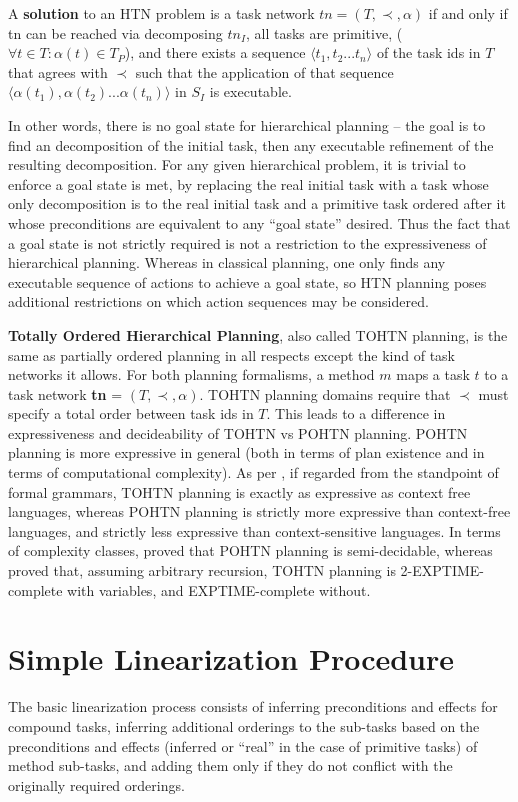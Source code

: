 \documentclass[letterpaper]{article} %
\begin{document}
A \textbf{solution} to an HTN problem is a task network $tn = (T, \prec, \alpha)$ if and only if
tn can be reached via decomposing $tn_I$, all tasks are primitive, ($\forall t \in T: \alpha(t) \in T_P$), and there exists a sequence $\langle t_1, t_2 ... t_n \rangle$ of the task ids in $T$ that agrees with $\prec$ such that the application of that sequence $\langle \alpha(t_1), \alpha(t_2) ... \alpha(t_n) \rangle$ in $S_I$ is executable.

In other words, there is no goal state for hierarchical planning -- the goal is to find an decomposition of the initial task, then any executable refinement of the resulting decomposition. For any given hierarchical problem, it is trivial to enforce a goal state is met, by replacing the real initial task with a task whose only decomposition is to the real initial task and a primitive task ordered after it whose preconditions are equivalent to any \enquote{goal state} desired. Thus the fact that a goal state is not strictly required is not a restriction to the expressiveness of hierarchical planning. Whereas in classical planning, one only finds any executable sequence of actions to achieve a goal state, so HTN planning poses additional restrictions on which action sequences may be considered.


\textbf{Totally Ordered Hierarchical Planning}, also called TOHTN planning, is the same as partially ordered planning in all respects except the kind of task networks it allows.
For both planning formalisms, a method $m$ maps a task $t$ to a task network \textbf{tn} = $(T, \prec, \alpha)$. TOHTN planning domains require that $\prec$ must specify a total order between task ids in $T$.
This leads to a difference in expressiveness and decideability of TOHTN vs POHTN planning. POHTN planning is more expressive in general (both in terms of plan existence and in terms of computational complexity). As per \cite{LanguageClassificationPlanning}, if regarded from the standpoint of formal grammars, TOHTN planning is exactly as expressive as context free languages, whereas POHTN planning is strictly more expressive than context-free languages, and strictly less expressive than context-sensitive languages.
In terms of complexity classes, \cite{ErolHTNExpressivity} proved that POHTN planning is semi-decidable, whereas \cite{Alford2015TightHTNBounds} proved that, assuming arbitrary recursion, TOHTN planning is 2-EXPTIME-complete with variables, and EXPTIME-complete without. 


\section{Simple Linearization Procedure}
The basic linearization process consists of inferring preconditions and effects for compound tasks, inferring additional orderings to the sub-tasks based on the preconditions and effects (inferred or \enquote{real} in the case of primitive tasks) of method sub-tasks, and adding them only if they do not conflict with the originally required orderings.
\end{document}
